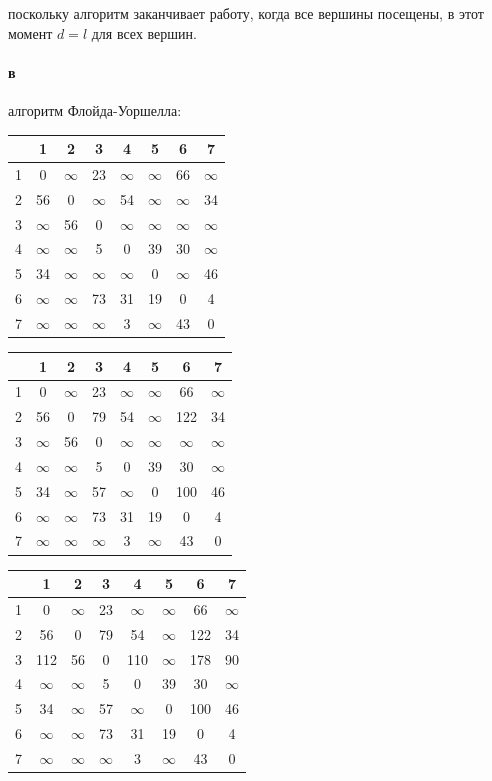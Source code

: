 \documentclass[russian]{article}
\begin{document}
поскольку алгоритм заканчивает работу, когда все вершины посещены, в этот момент $d=l$ для всех вершин.

\paragraph*{в} алгоритм Флойда-Уоршелла:

\begin{tabular}{|c|c|c|c|c|c|c|c|}\hline
& 1& 2& 3& 4& 5& 6& 7\\\hline
1&0&$\infty$&23&$\infty$&$\infty$&66&$\infty$\\\hline
2&56&0&$\infty$&54&$\infty$&$\infty$&34\\\hline
3&$\infty$&56&0&$\infty$&$\infty$&$\infty$&$\infty$\\\hline
4&$\infty$&$\infty$&5&0&39&30&$\infty$\\\hline
5&34&$\infty$&$\infty$&$\infty$&0&$\infty$&46\\\hline
6&$\infty$&$\infty$&73&31&19&0&4\\\hline
7&$\infty$&$\infty$&$\infty$&3&$\infty$&43&0\\\hline
\end{tabular}

\begin{tabular}{|c|c|c|c|c|c|c|c|}\hline
& 1& 2& 3& 4& 5& 6& 7\\\hline
1&0&$\infty$&23&$\infty$&$\infty$&66&$\infty$\\\hline
2&56&0&79&54&$\infty$&122&34\\\hline
3&$\infty$&56&0&$\infty$&$\infty$&$\infty$&$\infty$\\\hline
4&$\infty$&$\infty$&5&0&39&30&$\infty$\\\hline
5&34&$\infty$&57&$\infty$&0&100&46\\\hline
6&$\infty$&$\infty$&73&31&19&0&4\\\hline
7&$\infty$&$\infty$&$\infty$&3&$\infty$&43&0\\\hline
\end{tabular}

\begin{tabular}{|c|c|c|c|c|c|c|c|}\hline
& 1& 2& 3& 4& 5& 6& 7\\\hline
1&0&$\infty$&23&$\infty$&$\infty$&66&$\infty$\\\hline
2&56&0&79&54&$\infty$&122&34\\\hline
3&112&56&0&110&$\infty$&178&90\\\hline
4&$\infty$&$\infty$&5&0&39&30&$\infty$\\\hline
5&34&$\infty$&57&$\infty$&0&100&46\\\hline
6&$\infty$&$\infty$&73&31&19&0&4\\\hline
7&$\infty$&$\infty$&$\infty$&3&$\infty$&43&0\\\hline
\end{tabular}
\end{document}
